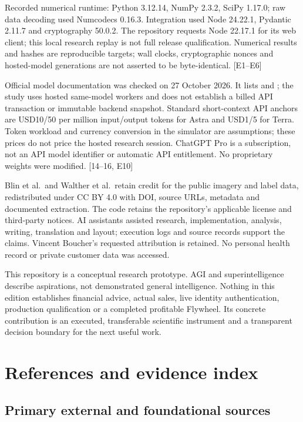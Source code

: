\documentclass[10pt,a4paper]{article}
\begin{document}
Recorded numerical runtime: Python 3.12.14, NumPy 2.3.2, SciPy 1.17.0;
raw data decoding used Numcodecs 0.16.3. Integration used Node 24.22.1,
Pydantic 2.11.7 and cryptography 50.0.2. The repository requests Node
22.17.1 for its web client; this local research replay is not full
release qualification. Numerical results and hashes are reproducible
targets; wall clocks, cryptographic nonces and hosted-model generations
are not asserted to be byte-identical. {[}E1--E6{]}

Official model documentation was checked on 27 October 2026. It lists
 and ; the study uses hosted
same-model workers and does not establish a billed API transaction or
immutable backend snapshot. Standard short-context API anchors are
USD10/50 per million input/output tokens for Astra and USD1/5 for Terra.
Token workload and currency conversion in the simulator are assumptions;
these prices do not price the hosted research session. ChatGPT Pro is a
subscription, not an API model identifier or automatic API entitlement.
No proprietary weights were modified. {[}14--16, E10{]}

Blin et al.~and Walther et al.~retain credit for the public imagery and
label data, redistributed under CC BY 4.0 with DOI, source URLs,
metadata and documented extraction. The code retains the repository's
applicable license and third-party notices. AI assistants assisted
research, implementation, analysis, writing, translation and layout;
execution logs and source records support the claims. Vincent Boucher's
requested attribution is retained. No personal health record or private
customer data was accessed.

This repository is a conceptual research prototype. AGI and
superintelligence describe aspirations, not demonstrated general
intelligence. Nothing in this edition establishes financial advice,
actual sales, live identity authentication, production qualification or
a completed profitable Flywheel. Its concrete contribution is an
executed, transferable scientific instrument and a transparent decision
boundary for the next useful work.

\clearpage

\hypertarget{references-and-evidence-index}{%
\section{References and evidence
index}\label{references-and-evidence-index}}

\hypertarget{primary-external-and-foundational-sources}{%
\subsection{Primary external and foundational
sources}\label{primary-external-and-foundational-sources}}
\end{document}

